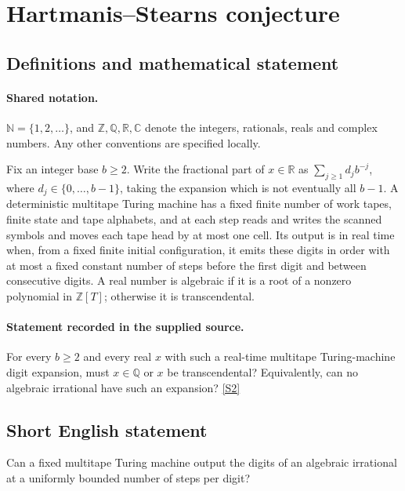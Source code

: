 \documentclass[11pt]{article}
\newcommand{\sref}[2]{\hyperlink{source:#1:#2}{[S#2]}}
\begin{document}
\section{Hartmanis–Stearns conjecture}\label{statement}

\subsection{Definitions and mathematical statement}

\paragraph{Shared notation.}$\mathbb N=\{1,2,\ldots\}$, and $\mathbb Z,\mathbb Q,\mathbb R,\mathbb C$ denote the integers, rationals, reals and complex numbers. Any other conventions are specified locally.


Fix an integer base $b\ge2$. Write the fractional part of $x\in\mathbb R$ as $\sum_{j\ge1}d_jb^{-j}$, where $d_j\in\{0,\ldots,b-1\}$, taking the expansion which is not eventually all $b-1$. A deterministic multitape Turing machine has a fixed finite number of work tapes, finite state and tape alphabets, and at each step reads and writes the scanned symbols and moves each tape head by at most one cell. Its output is in real time when, from a fixed finite initial configuration, it emits these digits in order with at most a fixed constant number of steps before the first digit and between consecutive digits. A real number is algebraic if it is a root of a nonzero polynomial in $\mathbb Z[T]$; otherwise it is transcendental.
\paragraph{Statement recorded in the supplied source.}
For every $b\ge2$ and every real $x$ with such a real-time multitape Turing-machine digit expansion, must $x\in\mathbb Q$ or $x$ be transcendental? Equivalently, can no algebraic irrational have such an expansion? \sref{statement}{2}
\subsection{Short English statement}
Can a fixed multitape Turing machine output the digits of an algebraic irrational at a uniformly bounded number of steps per digit?
\end{document}
